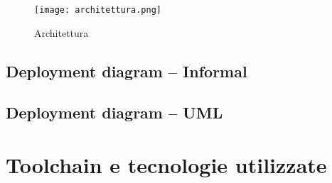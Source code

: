 \begin{figure}[H]
      \centering
      \texttt{[image: architettura.png]}
      \caption{Architettura}
      \label{architettura}
\end{figure}

\subsection{Deployment diagram -- Informal}

\subsection{Deployment diagram -- UML}

\section{Toolchain e tecnologie utilizzate}